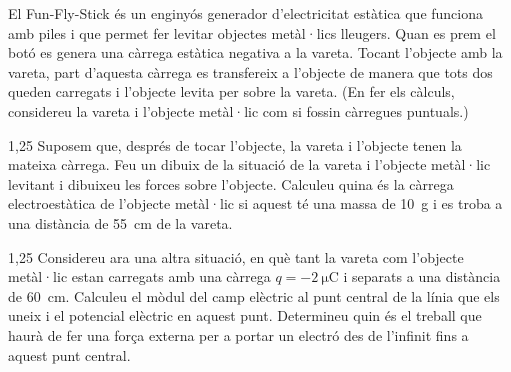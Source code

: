 El Fun-Fly-Stick és un enginyós generador d'electricitat estàtica que funciona amb piles i que permet fer levitar objectes metàl·lics lleugers. Quan es prem el botó es genera una càrrega estàtica negativa a la vareta. Tocant l'objecte amb la vareta, part d'aquesta càrrega es transfereix a l'objecte de manera que tots dos queden carregats i l'objecte levita per sobre la vareta. (En fer els càlculs, considereu la vareta i l'objecte metàl·lic com si fossin càrregues puntuals.)


\begin{apartat}{1,25}
Suposem que, després de tocar l'objecte, la vareta i l'objecte tenen la mateixa càrrega. Feu un dibuix de la situació de la vareta i l'objecte metàl·lic levitant i dibuixeu les forces sobre l'objecte. Calculeu quina és la càrrega electroestàtica de l'objecte metàl·lic si aquest té una massa de 10~g i es troba a una distància de 55~cm de la vareta.
\end{apartat}

\begin{apartat}{1,25}
Considereu ara una altra situació, en què tant la vareta com l'objecte metàl·lic estan carregats amb una càrrega $q = -2\ \mathrm{\mu C}$ i separats a una distància de 60~cm. Calculeu el mòdul del camp elèctric al punt central de la línia que els uneix i el potencial elèctric en aquest punt. Determineu quin és el treball que haurà de fer una força externa per a portar un electró des de l'infinit fins a aquest punt central.
\end{apartat}

